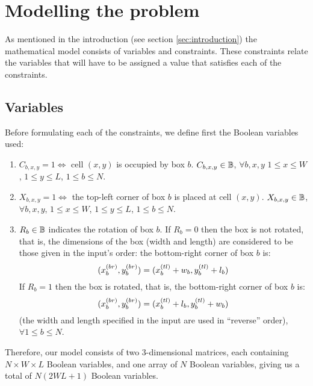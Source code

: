 \section{Modelling the problem}
\label{sec:modelling}

As mentioned in the introduction (see section \ref{sec:introduction}) the mathematical
model consists of variables and constraints. These constraints relate the variables that
will have to be assigned a value that satisfies each of the constraints.

\subsection{Variables}
\label{sec:modelling:variables}

Before formulating each of the constraints, we define first the Boolean variables used:

\begin{enumerate}
    \item \label{var:box-cell} $C_{b,x,y} = 1 \Longleftrightarrow$ cell $(x,y)$ is occupied
    by box $b$. $C_{b,x,y} \in \mathbb{B}$, $\forall b,x,y$ $1 \le x \le W$, $1 \le y \le L$,
    $1 \le b \le N$.
    
    \item \label{var:box-corner} $X_{b,x,y} = 1 \Longleftrightarrow$ the top-left corner of
    box $b$ is placed at cell $(x,y)$. $X_{b,x,y} \in \mathbb{B}$, $\forall b,x,y$,
    $1 \le x \le W$, $1 \le y \le L$, $1 \le b \le N$.
    
    \item \label{var:box-rotated} $R_b \in \mathbb{B}$ indicates the rotation of box $b$. If
    $R_b = 0$ then the box is not rotated, that is, the dimensions of the box (width and
    length) are considered to be those given in the input's order: the bottom-right corner
    of box $b$ is:
    \begin{equation}
    \label{eq:box-rotation-0}
    (\Xbr, \Ybr) = (\Xtl + w_b, \Ytl + l_b)
    \end{equation}
    If $R_b = 1$ then the box is rotated, that is, the bottom-right corner of box $b$ is:
    \begin{equation}
    \label{eq:box-rotation-1}
    (\Xbr, \Ybr) = (\Xtl + l_b, \Ytl + w_b)
    \end{equation}
    (the width and length specified in the input are used in ``reverse'' order), 
    $\forall 1 \le b \le N$.
\end{enumerate}

Therefore, our model consists of two 3-dimensional matrices, each containing
$N \times W \times L$ Boolean variables, and one array of $N$ Boolean variables, giving
us a total of $N(2WL + 1)$ Boolean variables.

